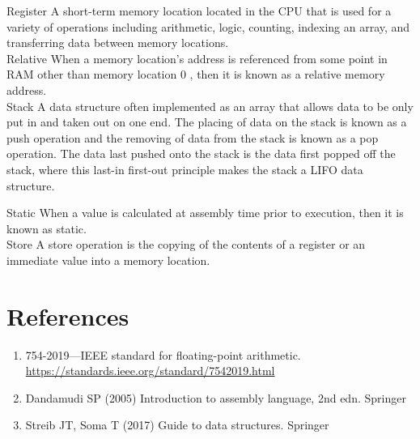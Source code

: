 \documentclass[10pt]{book}
\begin{document}
Register A short-term memory location located in the CPU that is used for a variety of operations including arithmetic, logic, counting, indexing an array, and transferring data between memory locations.\\
Relative When a memory location's address is referenced from some point in RAM other than memory location 0 , then it is known as a relative memory address.\\
Stack A data structure often implemented as an array that allows data to be only put in and taken out on one end. The placing of data on the stack is known as a push operation and the removing of data from the stack is known as a pop operation. The data last pushed onto the stack is the data first popped off the stack, where this last-in first-out principle makes the stack a LIFO data structure.

Static When a value is calculated at assembly time prior to execution, then it is known as static.\\

Store A store operation is the copying of the contents of a register or an immediate value into a memory location.


\section{References}
\begin{enumerate}
  \item 754-2019—IEEE standard for floating-point arithmetic. \href{https://standards.ieee.org/standard/7542019.html}{https://standards.ieee.org/standard/7542019.html}
  \item Dandamudi SP (2005) Introduction to assembly language, 2nd edn. Springer
  \item Streib JT, Soma T (2017) Guide to data structures. Springer
\end{enumerate}
\end{document}
